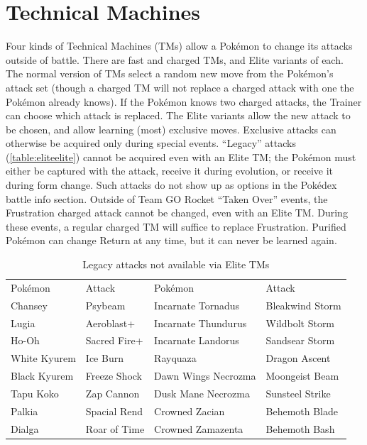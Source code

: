 



\section{Technical Machines\label{sec:tms}}
Four kinds of Technical Machines (TMs) allow a Pokémon to change its attacks outside of battle.
There are fast and charged TMs, and Elite variants of each.
The normal version of TMs select a random new move from the Pokémon's attack set (though a charged TM will not replace
 a charged attack with one the Pokémon already knows).
If the Pokémon knows two charged attacks, the Trainer can choose which attack is replaced.
The Elite variants allow the new attack to be chosen, and allow learning (most) exclusive moves.
Exclusive attacks can otherwise be acquired only during special events.
``Legacy'' attacks (\autoref{table:eliteelite}) cannot be acquired even
 with an Elite TM; the Pokémon must either be captured with the attack, receive
 it during evolution, or receive it during form change.
Such attacks do not show up as options in the Pokédex battle info section.
Outside of Team GO Rocket ``Taken Over'' events, the Frustration charged attack cannot be
 changed, even with an Elite TM\@.
During these events, a regular charged TM will suffice to replace Frustration.
Purified Pokémon can change Return at any time, but it can never be learned again.
\begin{table}[hb]
\centering\footnotesize
\begin{tabular}{ll|ll}
Pokémon & Attack & Pokémon & Attack\\
\Midrule
Chansey                 & Psybeam      & Incarnate Tornadus      & Bleakwind Storm\\
Lugia                   & Aeroblast+   & Incarnate Thundurus     & Wildbolt Storm\\
Ho-Oh                   & Sacred Fire+ & Incarnate Landorus      & Sandsear Storm\\
White Kyurem            & Ice Burn     & Rayquaza                & Dragon Ascent \\
Black Kyurem            & Freeze Shock & Dawn Wings Necrozma     & Moongeist Beam\\
Tapu Koko               & Zap Cannon   & Dusk Mane Necrozma      & Sunsteel Strike\\
Palkia                  & Spacial Rend & Crowned Zacian    & Behemoth Blade\\
Dialga                  & Roar of Time & Crowned Zamazenta& Behemoth Bash\\
\end{tabular}
\caption{Legacy attacks not available via Elite TMs\label{table:eliteelite}}
\end{table}


